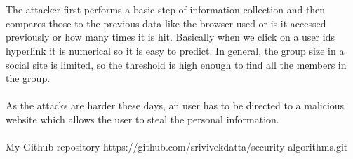 \documentclass[a4paper]{article}
\begin{document}
\\
\\
The attacker first performs a basic step of information collection and then compares those to the previous data like the browser used or is it accessed previously or how many times it is hit. Basically when we click on a user ids hyperlink it is numerical so it is easy to predict. In general, the group size in a social site is limited, so the threshold is high enough to find all the members in the group.
\\ 
\\
As the attacks are harder these days, an user has to be directed to a malicious website which allows the user to steal the personal information.
\\
\\	
My Github repository https://github.com/srivivekdatta/security-algorithms.git
\end{document}
